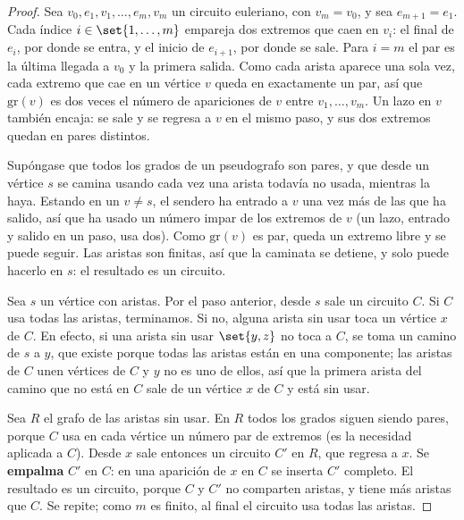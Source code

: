 \documentclass[11pt,letterpaper]{article}
\begin{document}
\begin{proof}
   Sea $v_0, e_1, v_1, \dots, e_m, v_m$ un circuito
  euleriano, con $v_m = v_0$, y sea $e_{m+1} = e_1$. Cada índice
  $i \in \set{1, \dots, m}$ empareja dos extremos que caen en $v_i$:
  el final de $e_i$, por donde se entra, y el inicio de $e_{i+1}$, por
  donde se sale. Para $i = m$ el par es la última llegada a $v_0$ y la
  primera salida. Como cada arista aparece una sola vez, cada extremo
  que cae en un vértice $v$ queda en exactamente un par, así que
  $\text{gr}(v)$ es dos veces el número de apariciones de $v$ entre
  $v_1, \dots, v_m$. Un lazo en $v$ también encaja: se sale y se
  regresa a $v$ en el mismo paso, y sus dos extremos quedan en pares
  distintos.

   Supóngase que todos los
  grados de un pseudografo son pares, y que desde un vértice $s$ se
  camina usando cada vez una arista todavía no usada, mientras la haya.
  Estando en un $v \neq s$, el sendero ha entrado a $v$ una vez más de
  las que ha salido, así que ha usado un número impar de los extremos
  de $v$ (un lazo, entrado y salido en un paso, usa dos). Como
  $\text{gr}(v)$ es par, queda un extremo libre y se puede seguir. Las
  aristas son finitas, así que la caminata se detiene, y solo puede
  hacerlo en $s$: el resultado es un circuito.

   Sea $s$ un vértice con aristas. Por el paso
  anterior, desde $s$ sale un circuito $C$. Si $C$ usa todas las
  aristas, terminamos. Si no, alguna arista sin usar toca un vértice
  $x$ de $C$. En efecto, si una arista sin usar $\set{y, z}$ no toca a
  $C$, se toma un camino de $s$ a $y$, que existe porque todas las
  aristas están en una componente; las aristas de $C$ unen vértices de
  $C$ y $y$ no es uno de ellos, así que la primera arista del camino
  que no está en $C$ sale de un vértice $x$ de $C$ y está sin usar.

  Sea $R$ el grafo de las aristas sin usar. En $R$ todos los grados
  siguen siendo pares, porque $C$ usa en cada vértice un número par de
  extremos (es la necesidad aplicada a $C$). Desde $x$ sale entonces
  un circuito $C'$ en $R$, que regresa a $x$. Se \textbf{empalma}
  $C'$ en $C$: en una aparición de $x$ en $C$ se inserta $C'$
  completo. El resultado es un circuito, porque $C$ y $C'$ no
  comparten aristas, y tiene más aristas que $C$. Se repite; como $m$
  es finito, al final el circuito usa todas las aristas.
\end{proof}
\end{document}
